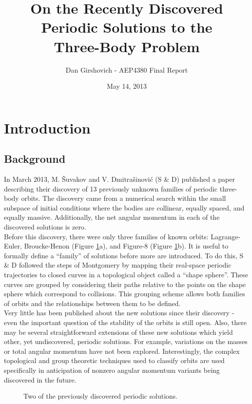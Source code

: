 \documentclass[12pt]{article}
\title{On the Recently Discovered Periodic Solutions to the \\ Three-Body Problem }
\author{Dan Girshovich - AEP4380 Final Report}
\date{May 14, 2013}
\begin{document}
\maketitle
\section{Introduction}
\subsection{Background}
In March 2013, M. Šuvakov and V. Dmitrašinović (S \& D) published a paper \cite{suv} describing their discovery of 13 previously unknown families of periodic three-body orbits. The discovery came from a numerical search within the small subspace of initial conditions where the bodies are collinear, equally spaced, and equally massive. Additionally, the net angular momentum in each of the discovered solutions is zero. \\

Before this discovery, there were only three families of known orbits: Lagrange-Euler, Broucke-Henon (Figure \ref{f1}a), and Figure-8 (Figure \ref{f1}b). It is useful to formally define a ``family'' of solutions before more are introduced. To do this, S \& D followed the steps of Montgomery \cite{mont} by mapping their real-space periodic trajectories to closed curves in a topological object called a ``shape sphere''. These curves are grouped by considering their paths relative to the points on the shape sphere which correspond to collisions. This grouping scheme allows both families of orbits and the relationships between them to be defined. \\

Very little has been published about the new solutions since their discovery - even the important question of the stability of the orbits is still open. Also, there may be several straightforward extensions of these new solutions which yield other, yet undiscovered, periodic solutions. For example, variations on the masses or total angular momentum have not been explored. Interestingly, the complex topological and group theoretic techniques used to classify orbits are used specifically in anticipation of nonzero angular momentum variants being discovered in the future.

\begin{figure}
 \qquad
{} \qquad
\caption{Two of the previously discovered periodic solutions.}
\label{f1}
\end{figure}
\end{document}
